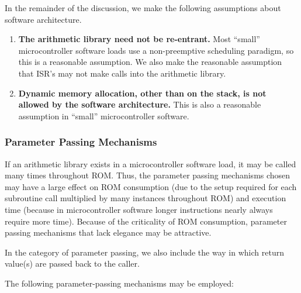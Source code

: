 In the remainder of the discussion, we make the following assumptions
about software architecture.

\begin{enumerate}
\item \textbf{The arithmetic library need not be re-entrant.}
      Most ``small'' microcontroller software loads use a non-preemptive
      scheduling paradigm, so this is a reasonable assumption.  We also
      make the reasonable assumption that ISR's may not make calls into 
      the arithmetic library.
\item \textbf{Dynamic memory allocation, other than on the stack,
      is not allowed by the software architecture.}  This is also
      a reasonable assumption in ``small'' microcontroller software.
\end{enumerate}

\subsubsection{Parameter Passing Mechanisms}
\label{ccil0:spdi0:sppm0:sppm0}

If an arithmetic library exists in a microcontroller software load,
it may be called many times throughout ROM.  Thus, the parameter 
passing mechanisms chosen may have a large effect on ROM consumption
(due to the setup required for each subroutine call multiplied by
many instances throughout ROM) and execution time
(because in microcontroller software longer instructions nearly always
require more time).  Because of the criticality of ROM consumption,
parameter passing mechanisms that lack elegance may be attractive.

In the category of parameter passing, we also include the way in which
return value(s) are passed back to the caller.

The following parameter-passing mechanisms may be employed:

